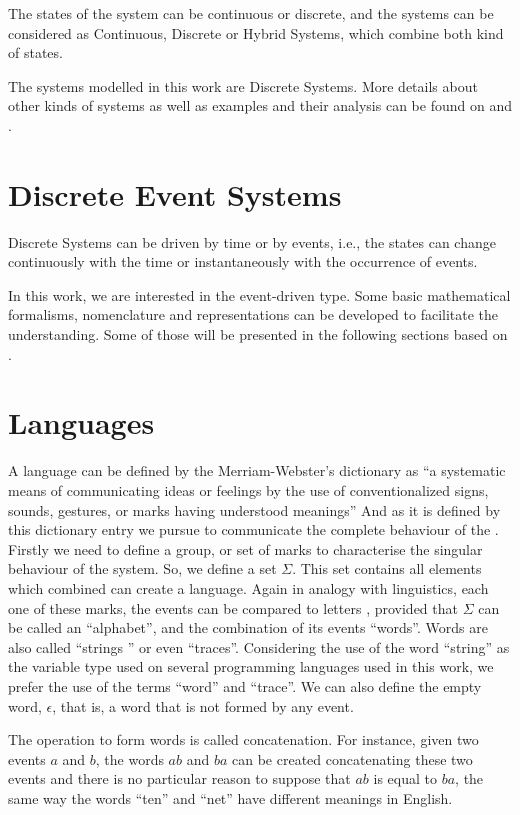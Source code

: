 The states of the system can be continuous or discrete, and the systems can be considered as Continuous, Discrete or 
Hybrid Systems, which combine both kind of states.

The systems modelled in this work are Discrete Systems. More details about other
kinds of systems as well as examples and their analysis can be found on
\cite{oppenheim1996signals} and \cite{kalouptsidis1997signal}.
\section{Discrete Event Systems}
\label{sec:discreteEventSystems}
Discrete Systems can be driven by time or by events, i.e., the states can
change continuously with the time or instantaneously with the occurrence of events.

In this work, we are interested in the event-driven type. Some basic mathematical
formalisms, nomenclature and representations can be developed to facilitate the
understanding. Some of those will be presented in the following sections based
on \cite{cassandras2009introduction, david2005discrete,david1989grafcet}.
\section{Languages} \label{sec:automata} A language can be defined by the Merriam-Webster's dictionary as ``a systematic
means of communicating ideas or feelings by the use of conventionalized signs,
sounds, gestures, or marks having understood meanings'' And as it is defined by
this dictionary entry we pursue to communicate the complete behaviour of the
\DES. Firstly we need to define a group, or set of marks to characterise the
singular behaviour of the system. So, we define a set $\Sigma$. This set contains
all elements which combined can create a language. Again in analogy with
linguistics, each one of these marks, the events can be compared to letters ,
provided that $\Sigma$ can be called an ``alphabet'', and the combination of its
events ``words''. Words are also called ``strings '' or even ``traces''.
Considering the use of the word ``string'' as the variable type used on several
programming languages used in this work, we prefer the use of the terms
``word'' and ``trace''. We can also define the empty word,
$\epsilon$, that is, a word that is not formed by any event.

The operation to form words is called concatenation. For instance,
given two events $a$ and $b$, the words $ab$ and $ba$ can be created concatenating these two events and there is no particular reason to suppose that $ab$ is equal to $ba$, the same way the words ``ten'' and ``net'' have different meanings in English.

